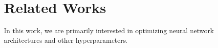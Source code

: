 \chapter{Related Works}

In this work, we are primarily interested in optimizing neural network architectures and other hyperparameters.


